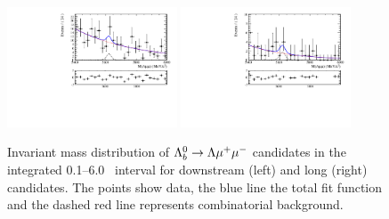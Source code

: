 %
%
\begin{figure}
\centering
\includegraphics[width=0.45\textwidth]{Lmumu/figs/MassFits/Lb2Lmumu_DD_lowQ2_fitAndRes.pdf}
\includegraphics[width=0.45\textwidth]{Lmumu/figs/MassFits/Lb2Lmumu_LL_lowQ2_fitAndRes.pdf}
\caption{Invariant mass distribution of $\Lambda^0_b\rightarrow\Lambda\mu^+\mu^-$ candidates in the integrated 0.1--6.0 
\gevgevcccc ~\qsq interval for downstream (left) and long (right) candidates. The points show data, the blue line
the total fit function and the dashed red line represents combinatorial background.}
\label{fig:Lb_LmumuLowQ2}
\end{figure}
%
